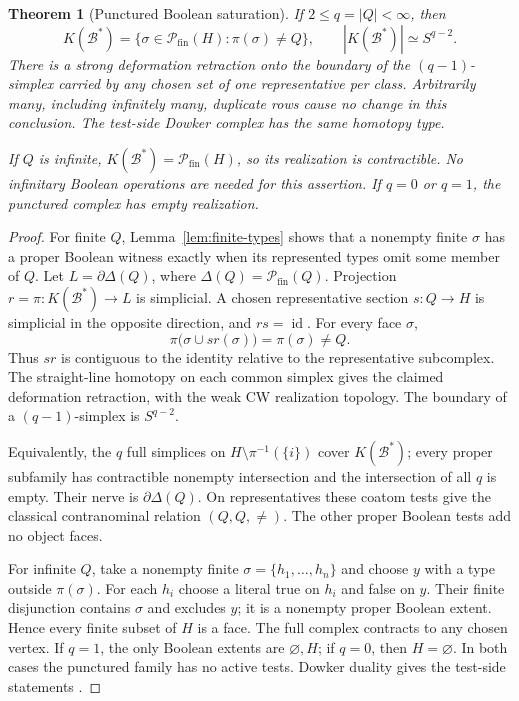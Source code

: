 \documentclass[11pt]{article}
\newtheorem{theorem}{Theorem}[section]
\theoremstyle{definition}
\newcommand{\Fin}{\mathcal P_{\mathrm{fin}}}
\newcommand{\id}{\operatorname{id}}
\begin{document}
\begin{theorem}[Punctured Boolean saturation]\label{thm:sphere}
If $2\le q=|Q|<\infty$, then
\[
 K(\mathcal B^*)=
 \{\sigma\in\Fin(H):\pi(\sigma)\ne Q\},
 \qquad |K(\mathcal B^*)|\simeq S^{q-2}.
\]
There is a strong deformation retraction onto the boundary of the
$(q-1)$-simplex carried by any chosen set of one representative per class.
Arbitrarily many, including infinitely many, duplicate rows cause no change
in this conclusion. The test-side Dowker complex has the same homotopy type.

If $Q$ is infinite, $K(\mathcal B^*)=\Fin(H)$, so its realization is
contractible. No infinitary Boolean operations are needed for this assertion.
If $q=0$ or $q=1$, the punctured complex has empty realization.
\end{theorem}
\begin{proof}
For finite $Q$, Lemma~\ref{lem:finite-types} shows that a nonempty finite
$\sigma$ has a proper Boolean witness exactly when its represented types
omit some member of $Q$. Let $L=\partial\Delta(Q)$, where
$\Delta(Q)=\Fin(Q)$. Projection $r=\pi:K(\mathcal B^*)\to L$ is
simplicial. A chosen representative section $s:Q\to H$ is simplicial
in the opposite direction, and $rs=\id$. For every face $\sigma$,
\[
 \pi\bigl(\sigma\cup sr(\sigma)\bigr)=\pi(\sigma)\ne Q.
\]
Thus $sr$ is contiguous to the identity relative to the representative
subcomplex. The straight-line homotopy on each common simplex gives the
claimed deformation retraction, with the weak CW realization topology.
The boundary of a $(q-1)$-simplex is $S^{q-2}$.

Equivalently, the $q$ full simplices on
$H\setminus\pi^{-1}(\{i\})$ cover $K(\mathcal B^*)$; every proper
subfamily has contractible nonempty intersection and the intersection of
all $q$ is empty. Their nerve is $\partial\Delta(Q)$. On representatives
these coatom tests give the classical contranominal relation $(Q,Q,\ne)$.
The other proper Boolean tests add no object faces.

For infinite $Q$, take a nonempty finite
$\sigma=\{h_1,\ldots,h_n\}$ and choose $y$ with a type outside
$\pi(\sigma)$. For each $h_i$ choose a literal true on $h_i$ and false
on $y$. Their finite disjunction contains $\sigma$ and excludes $y$;
it is a nonempty proper Boolean extent. Hence every finite subset of $H$
is a face. The full complex contracts to any chosen vertex.
If $q=1$, the only Boolean extents are $\varnothing,H$; if $q=0$, then
$H=\varnothing$. In both cases the punctured family has no active tests.
Dowker duality gives the test-side statements \cite{BrunSalbu}.
\end{proof}
\end{document}
